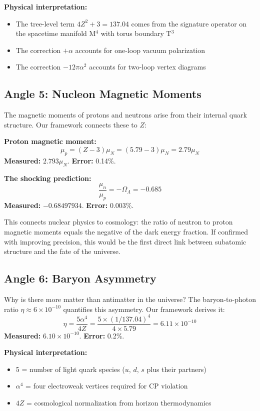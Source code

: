 \documentclass[11pt,a4paper]{article}
\theoremstyle{plain}
\theoremstyle{definition}
\theoremstyle{remark}
\newcommand{\OmegaL}{\Omega_\Lambda}
\begin{document}
\textbf{Physical interpretation:}
\begin{itemize}
  \item The tree-level term $4Z^2 + 3 = 137.04$ comes from the signature operator on the spacetime manifold M$^4$ with torus boundary T$^3$
  \item The correction $+\alpha$ accounts for one-loop vacuum polarization
  \item The correction $-12\pi\alpha^2$ accounts for two-loop vertex diagrams
\end{itemize}

\subsection{Angle 5: Nucleon Magnetic Moments}

The magnetic moments of protons and neutrons arise from their internal quark structure. Our framework connects these to $Z$:

\textbf{Proton magnetic moment:}
\[
\mu_p = (Z - 3)\mu_N = (5.79 - 3)\mu_N = 2.79\mu_N
\]
\textbf{Measured:} $2.793\mu_N$. \textbf{Error:} 0.14\%.

\textbf{The shocking prediction:}
\[
\frac{\mu_n}{\mu_p} = -\OmegaL = -0.685
\]
\textbf{Measured:} $-0.68497934$. \textbf{Error:} 0.003\%.

This connects nuclear physics to cosmology: the ratio of neutron to proton magnetic moments equals the negative of the dark energy fraction. If confirmed with improving precision, this would be the first direct link between subatomic structure and the fate of the universe.

\subsection{Angle 6: Baryon Asymmetry}

Why is there more matter than antimatter in the universe? The baryon-to-photon ratio $\eta \approx 6 \times 10^{-10}$ quantifies this asymmetry. Our framework derives it:
\[
\eta = \frac{5\alpha^4}{4Z} = \frac{5 \times (1/137.04)^4}{4 \times 5.79} = 6.11 \times 10^{-10}
\]
\textbf{Measured:} $6.10 \times 10^{-10}$. \textbf{Error:} 0.2\%.

\textbf{Physical interpretation:}
\begin{itemize}
  \item 5 = number of light quark species ($u$, $d$, $s$ plus their partners)
  \item $\alpha^4$ = four electroweak vertices required for CP violation
  \item $4Z$ = cosmological normalization from horizon thermodynamics
\end{itemize}
\end{document}
